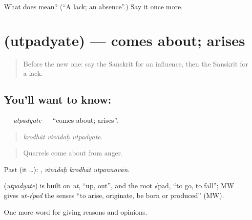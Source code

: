\begin{tcolorbox}[breakable,colback=teal!4,colframe=teal!35!black,title={Before you move on}]
What does  mean? (\textquotedblleft{}A lack; an absence\textquotedblright{}.) Say it once more.
\end{tcolorbox}
\section[\texorpdfstring{\sk{उत्पद्यते} (utpadyate)}{उत्पद्यते (utpadyate)}]{ (utpadyate) — comes about; arises}

\label{lesson:SA-C340-utpadyate}



\begin{quote}
Before the new one: say the Sanskrit for an influence, then the Sanskrit for a lack.
\end{quote}

\subsection*{You'll want to know: }
\textbf{} — \emph{utpadyate} — \textquotedblleft{}comes about; arises\textquotedblright{}.

\begin{quote}
  
\end{quote}

\begin{quote}
\emph{krodhāt vivādaḥ utpadyate.}
\end{quote}

\begin{quote}
Quarrels come about from anger.
\end{quote}

Past (it …):   , \emph{vivādaḥ krodhāt utpannavān}.

\begin{cousinweb}
\textbf{} (\emph{utpadyate}) is built on \emph{ut}, \textquotedblleft{}up, out\textquotedblright{}, and the root √pad, \textquotedblleft{}to go, to fall\textquotedblright{}; MW gives \emph{ut-√pad} the senses \textquotedblleft{}to arise, originate, be born or produced\textquotedblright{} (MW).
\end{cousinweb}

\begin{grammarlens}[title={What you've built}]
One more word for giving reasons and opinions.
\end{grammarlens}

